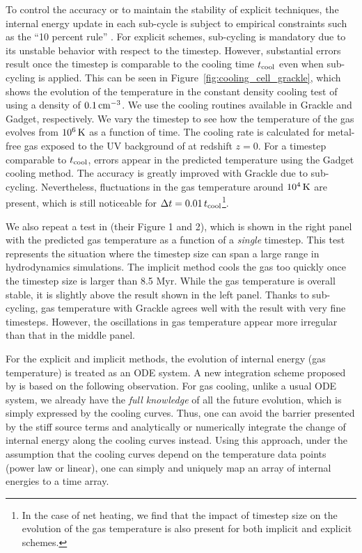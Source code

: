 \documentclass[a4paper,fleqn,usenatbib,useAMS, twocolumn]{mnras}
\begin{document}
To control the accuracy or to maintain the stability of explicit
techniques, the internal energy update in each sub-cycle is subject
to empirical constraints such as the ``10 percent rule''
\citep{Teyssier2015, Smith2016}. For explicit schemes, sub-cycling is
mandatory due to its unstable behavior with respect to the timestep.
However, substantial errors result once the timestep is comparable
to the cooling time $t_{\rm cool}$ even when sub-cycling is
applied. This can be seen in Figure~\ref{fig:cooling_cell_grackle},
which shows the evolution of the temperature in the constant density
cooling test of \cite{Smith2016} using a density of $0.1\,\rm{cm}^{-3}$. 
We use the cooling routines
available in {\sc Grackle} and {\sc Gadget}, respectively. We vary the
timestep to see how the temperature of the gas evolves from $10^6\,
\rm{K}$ as a function of time. The cooling rate is calculated for
metal-free gas exposed to the UV background of
{\protect\cite{Haardt2012}} at redshift $z = 0$. For a timestep
comparable to $t_{\rm cool}$, errors appear in the predicted
temperature using the {\sc Gadget} cooling method. The
accuracy is greatly
improved with {\sc Grackle} due to sub-cycling. Nevertheless,
fluctuations in the gas temperature around $10^4\, \rm{K}$ are present,
which is still noticeable for $\Delta t=0.01\, t_{\rm cool}$\footnote{
  In the case of net heating, we find that the impact of timestep size
  on the evolution of the gas temperature is also present for both
  implicit and explicit schemes.}.

We also repeat a test in \cite{Townsend2009} (their Figure 1 and 2), 
which is shown in the right panel with
the predicted gas temperature as a function of a \textit{single} timestep. 
This test represents the situation where the timestep size can span a large range 
in hydrodynamics simulations. The implicit method cools the gas too quickly once
the timestep size is larger than 8.5 Myr. While the gas temperature is overall stable, 
it is slightly above the result shown in the left panel. Thanks to sub-cycling, 
gas temperature with {\sc Grackle} agrees well with the result with very fine timesteps. 
However, the oscillations in gas temperature appear more irregular than that in the 
middle panel.

For the explicit and implicit methods, the evolution of internal
energy (gas temperature) is treated as an ODE system. A new
integration scheme proposed by \cite{Townsend2009} is based on the
following observation. For gas cooling, unlike a usual ODE system, we
already have the \textit{full knowledge} of all the future
evolution, which is simply expressed by the cooling curves.  Thus, one
can avoid the barrier presented by the stiff source terms and
analytically or numerically integrate the change of internal energy
along the cooling curves instead. Using this approach, under the
assumption that the cooling curves depend on the temperature data
points (power law or linear), one can simply and uniquely map an array
of internal energies to a time array.
\end{document}
